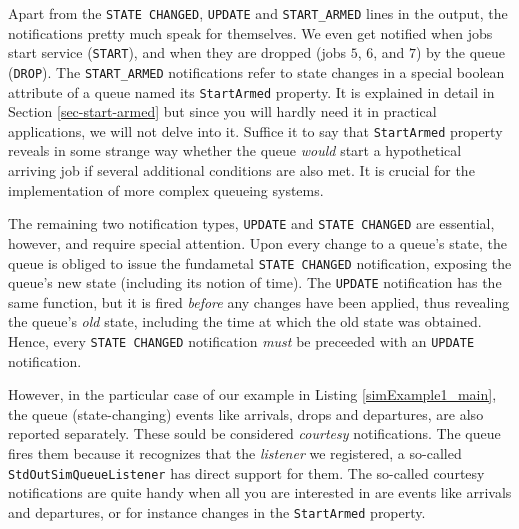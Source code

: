 \documentclass[12pt]{book}
\begin{document}
Apart from the \lstinline-STATE CHANGED-, \lstinline-UPDATE-
  and \lstinline-START_ARMED- lines in the output,
  the notifications pretty much speak for themselves.
We even get notified when jobs start service (\lstinline-START-),
  and when they are dropped (jobs $5$, $6$, and $7$)
  by the queue (\lstinline -DROP-).
The \lstinline-START_ARMED- notifications
  refer to state changes in a special boolean attribute of a
  queue named its \lstinline-StartArmed- property.
It is explained in detail in Section \ref{sec-start-armed}
  but since you will hardly need it in practical applications,
  we will not delve into it.
Suffice it to say that \lstinline|StartArmed| property
  reveals in some strange way
  whether the queue {\em would\/}
  start a hypothetical arriving job
  if several additional conditions are also met.
It is crucial for the implementation
  of more complex queueing systems.

The remaining two notification types, \lstinline|UPDATE| and \lstinline|STATE CHANGED|
  are essential, however, and require special attention.
Upon every change to a queue's state,
  the queue is obliged to issue the fundametal \lstinline|STATE CHANGED| notification,
  exposing the queue's new state (including its notion of time).
The \lstinline|UPDATE| notification
  has the same function,
  but it is fired {\em before\/} any changes have been applied,
  thus revealing the queue's {\em old\/} state,
  including the time at which the old state was obtained.
Hence,
  every \lstinline|STATE CHANGED| notification
  {\em must\/} be preceeded with an
  \lstinline|UPDATE| notification.

However, in the particular case of our example in Listing \ref{simExample1_main},
  the queue (state-changing) events like arrivals, drops and departures,
  are also reported separately.
These sould be considered {\em courtesy\/} notifications.
The queue fires them because it recognizes that the
  {\em listener\/} we registered,
  a so-called \lstinline|StdOutSimQueueListener|
  has direct support for them.
The so-called courtesy notifications are quite handy when all
  you are interested in are events like arrivals and
  departures, or for instance changes in the \lstinline|StartArmed| property.
\end{document}
